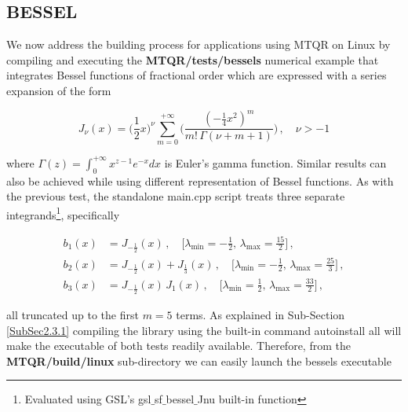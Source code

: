 \documentclass[a4paper, twosided]{book}
\begin{document}
\subsection[Bessel]{\changefont BESSEL}\label{SubSec2.4.2}
We now address the building process for applications using MTQR on Linux by compiling and executing the \colorbox{poliGrayBlue}{\textbf{MTQR/tests/bessels}} numerical example that integrates Bessel functions of fractional order \cite{Abramowitz} which are expressed with a series expansion of the form

\begin{equation*}
    J_{\nu}(x) = \bigg(\frac{1}{2}x\bigg)^{\nu}\sum_{m=0}^{+\infty}\bigg(\frac{(-\frac{1}{4}x^2)^{m}}{m!\,\Gamma(\nu+m+1)}\bigg)\,,\quad\nu>-1
\end{equation*}

\noindent
where $\Gamma(z)=\int_0^{+\infty}x^{z-1}e^{-x}dx$ is Euler's gamma function. Similar results can also be achieved while using different representation of Bessel functions. As with the previous test, the standalone \colorbox{poliGrayBlue}{main.cpp} script treats three separate integrands\footnote{Evaluated using GSL's \colorbox{poliGrayBlue}{gsl$\_$sf$\_$bessel$\_$Jnu} built-in function}, specifically

\begin{equation*}
    \begin{split}
        b_1(x) & = J_{-\frac{1}{2}}(x)\,,\quad\bigg[\lambda_{\text{min}}=-\frac{1}{2},\, \lambda_{\text{max}}=\frac{15}{2}\bigg]\,, \\
        b_2(x) & = J_{-\frac{1}{2}}(x) + J_{\frac{1}{3}}(x)\,,\quad\bigg[\lambda_{\text{min}}=-\frac{1}{2},\, \lambda_{\text{max}}=\frac{25}{3}\bigg]\,, \\
        b_3(x) & = J_{-\frac{1}{2}}(x)\,J_{1}(x)\,,\quad\bigg[\lambda_{\text{min}}=\frac{1}{2},\, \lambda_{\text{max}}=\frac{33}{2}\bigg]\,,
    \end{split}
\end{equation*}

\noindent
all truncated up to the first $m=5$ terms. As explained in Sub-Section \ref{SubSec2.3.1} compiling the library using the built-in command \colorbox{poliGrayBlue}{autoinstall all} will make the executable of both tests readily available. Therefore, from the \colorbox{poliGrayBlue}{\textbf{MTQR/build/linux}} sub-directory we can easily launch the \colorbox{poliGrayBlue}{bessels} executable
\end{document}
